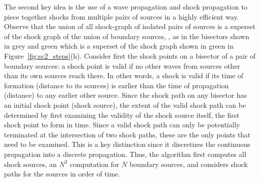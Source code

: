The second key idea is the use of a wave propagation and shock propagation to piece together shocks from multiple pairs of sources in a highly efficient way. Observe that the union of all shock-graph of isolated pairs of sources is a superset of the shock graph of the union of boundary sources, \eg, as in the bisectors shown in grey and green which is a superset of the shock graph shown in green in Figure~\ref{fig:sc2_steps}{(h)}. Consider first the shock points on a bisector of a pair of boundary sources: a shock point is valid if no other waves from sources other than its own sources reach there. In other words, a shock is valid if its time of formation (distance to its sources) is earlier than the time of propagation (distance) to any earlier other source. Since the shock path on any bisector has an initial shock point (shock source), the extent of the valid shock path can be determined by first examining the validity of the shock source itself, the first shock point to form in time. Since a valid shock path can only be potentially terminated at the intersection of two shock paths, these are the only points that need to be examined. This is a key distinction since it discretizes the continuous propagation into a discrete propagation. Thus, the algorithm first computes all shock sources, an $N^2$ computation for $N$ boundary sources, and considers shock paths for the sources in order of time. 

